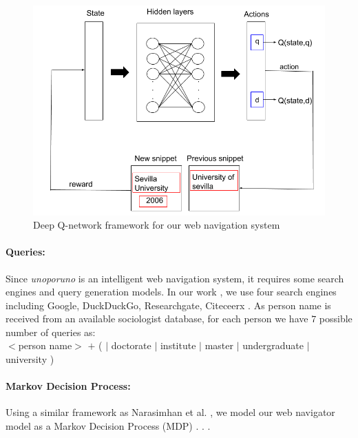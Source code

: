 
\begin{figure}[!t]
\centering
\includegraphics[scale=0.3]{./images/neural-network.png}
\caption{Deep Q-network framework for our web navigation system  }
\label{fig:naviagte}
\end{figure}

\paragraph{Queries: }  Since \textit{unoporuno} is an intelligent web navigation system, it requires some search engines and query generation models. In our work , we use four search engines including Google, DuckDuckGo, Researchgate, Citeceerx  . As person name is received from an available sociologist database, for each person we have $7$ possible number of queries as: \\

$<$person name$>$ $+$ (  $|$ doctorate $|$ institute $|$ master $|$ undergraduate $|$ university ) 

\paragraph{Markov Decision Process: } Using a similar framework as Narasimhan et al. , we model our web navigator model as a Markov Decision Process (MDP) \cite{puterman1994}. . .

